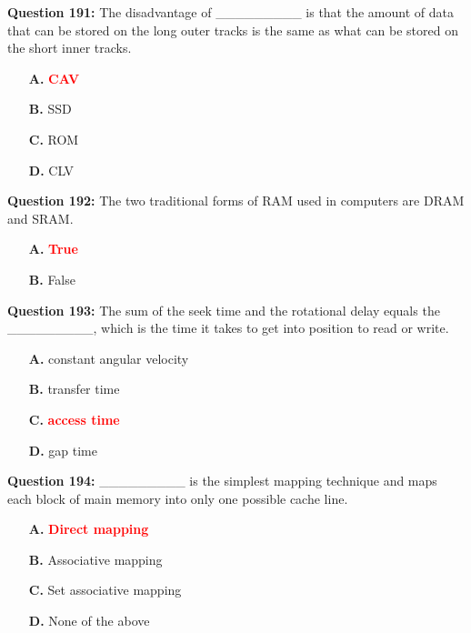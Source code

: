 \documentclass[12pt,a4paper]{article}
\begin{document}
\vspace{0.5cm}

\textbf{Question 191:} The disadvantage of _________ is that the amount of data that can be stored on the long outer tracks is the same as what can be stored on the short inner tracks.

\begin{itemize}
    \item[\textbf{A.}] \textcolor{red}{\textbf{CAV}}
    \item[\textbf{B.}] SSD
    \item[\textbf{C.}] ROM
    \item[\textbf{D.}] CLV
\end{itemize}

\vspace{0.5cm}

\textbf{Question 192:} The two traditional forms of RAM used in computers are DRAM and SRAM.

\begin{itemize}
    \item[\textbf{A.}] \textcolor{red}{\textbf{True}}
    \item[\textbf{B.}] False
\end{itemize}

\vspace{0.5cm}

\textbf{Question 193:} The sum of the seek time and the rotational delay equals the _________, which is the time it takes to get into position to read or write.

\begin{itemize}
    \item[\textbf{A.}] constant angular velocity
    \item[\textbf{B.}] transfer time
    \item[\textbf{C.}] \textcolor{red}{\textbf{access time}}
    \item[\textbf{D.}] gap time
\end{itemize}

\vspace{0.5cm}

\textbf{Question 194:} _________ is the simplest mapping technique and maps each block of main memory into only one possible cache line.

\begin{itemize}
    \item[\textbf{A.}] \textcolor{red}{\textbf{Direct mapping}}
    \item[\textbf{B.}] Associative mapping
    \item[\textbf{C.}] Set associative mapping
    \item[\textbf{D.}] None of the above
\end{itemize}
\end{document}
